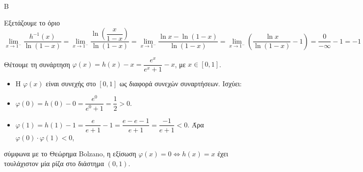 \begin{thema}{Β}
\begin{erwthma}
\item Εξετάζουμε το όριο \[\displaystyle\lim\limits_{x \to 1^-} \dfrac{h^{-1}(x)}{\ln(1-x)} = \lim\limits_{x \to 1^-} \dfrac{\ln\left(\dfrac{x}{1-x}\right)}{\ln(1-x)} = \lim\limits_{x \to 1^-} \dfrac{\ln x - \ln(1-x)}{\ln(1-x)} = \lim\limits_{x \to 1^-} \left( \dfrac{\ln x}{\ln(1-x)} - 1 \right)=\frac{0}{-\infty}-1=-1\]
\item Θέτουμε τη συνάρτηση $\varphi(x) = h(x) - x = \dfrac{e^x}{e^x+1} - x$, με $x \in [0, 1]$.
\begin{itemize}
\item Η $\varphi(x)$ είναι συνεχής στο $[0, 1]$ ως διαφορά συνεχών συναρτήσεων.
Ισχύει:
\item $\varphi(0) = h(0) - 0 = \dfrac{e^0}{e^0+1} = \dfrac{1}{2} > 0$.
\item $\varphi(1) = h(1) - 1 = \dfrac{e}{e+1} - 1 = \dfrac{e - e - 1}{e+1} = \dfrac{-1}{e+1} < 0$. Άρα $\varphi(0) \cdot \varphi(1) < 0$,
\end{itemize}
 σύμφωνα με το Θεώρημα Bolzano, η εξίσωση $\varphi(x) = 0 \Leftrightarrow h(x) = x$ έχει τουλάχιστον μία ρίζα στο διάστημα $(0, 1)$.
\end{erwthma}
\end{thema}
